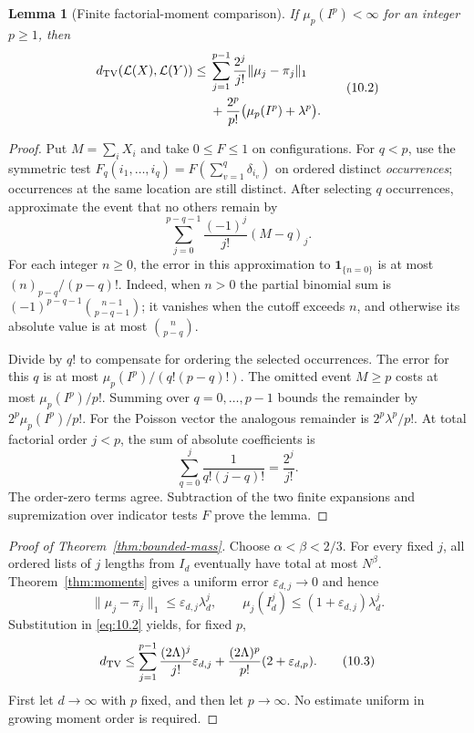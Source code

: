 \documentclass[11pt]{article}
\newtheorem{lemma}[theorem]{Lemma}
\theoremstyle{remark}
\begin{document}
\begin{lemma}[Finite factorial-moment comparison]\label{lem:finite-ie}
If $\mu_p(I^p)<\infty$ for an integer $p\ge1$, then
\[
 \begin{aligned}
 d_{\rm TV}(\mathcal L(X),\mathcal L(Y))
 \le{}&\sum_{j=1}^{p-1}\frac{2^j}{j!}\|\mu_j-\pi_j\|_1\\
 &+\frac{2^p}{p!}\bigl(\mu_p(I^p)+\lambda^p\bigr).
 \end{aligned}
 \tag{10.2}\label{eq:10.2}
\]
\end{lemma}
\begin{proof}
Put $M=\sum_iX_i$ and take $0\le F\le1$ on configurations. For $q<p$,
use the symmetric test
$F_q(i_1,\ldots,i_q)=F(\sum_{v=1}^q\delta_{i_v})$ on ordered distinct
\emph{occurrences}; occurrences at the same location are still distinct.
After selecting $q$ occurrences, approximate the event that no others
remain by
\[
 \sum_{j=0}^{p-q-1}\frac{(-1)^j}{j!}(M-q)_j.
\]
For each integer $n\ge0$, the error in this approximation to
$\mathbf1_{\{n=0\}}$ is at most $(n)_{p-q}/(p-q)!$.
Indeed, when $n>0$ the partial binomial sum is
$(-1)^{p-q-1}\binom{n-1}{p-q-1}$; it vanishes when the cutoff exceeds $n$,
and otherwise its absolute value is at most $\binom{n}{p-q}$.

Divide by $q!$ to compensate for ordering the selected occurrences.
The error for this $q$ is at most
$\mu_p(I^p)/(q!(p-q)!)$. The omitted event $M\ge p$ costs at most
$\mu_p(I^p)/p!$. Summing over $q=0,\ldots,p-1$ bounds the remainder by
$2^p\mu_p(I^p)/p!$.
For the Poisson vector the analogous remainder is $2^p\lambda^p/p!$.
At total factorial order $j<p$, the sum of absolute coefficients is
\[
 \sum_{q=0}^j\frac1{q!(j-q)!}=\frac{2^j}{j!}.
\]
The order-zero terms agree. Subtraction of the two finite expansions and
supremization over indicator tests $F$ prove the lemma.
\end{proof}

\begin{proof}[Proof of Theorem~\ref{thm:bounded-mass}]
Choose $\alpha<\beta<2/3$. For every fixed $j$, all ordered lists of $j$
lengths from $I_d$ eventually have total at most $N^\beta$. Theorem~\ref{thm:moments}
gives a uniform error $\varepsilon_{d,j}\to0$ and hence
\[
 \|\mu_j-\pi_j\|_1\le\varepsilon_{d,j}\lambda_d^j,
 \qquad
 \mu_j(I_d^j)\le(1+\varepsilon_{d,j})\lambda_d^j.
\]
Substitution in \eqref{eq:10.2} yields, for fixed $p$,
\[
 d_{\rm TV}\le
 \sum_{j=1}^{p-1}\frac{(2\Lambda)^j}{j!}\varepsilon_{d,j}
 +\frac{(2\Lambda)^p}{p!}(2+\varepsilon_{d,p}).
 \tag{10.3}\label{eq:10.3}
\]
First let $d\to\infty$ with $p$ fixed, and then let $p\to\infty$.
No estimate uniform in growing moment order is required.
\end{proof}
\end{document}
